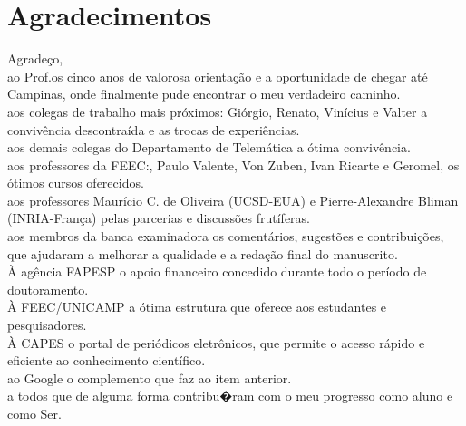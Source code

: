 
\chapter*{Agradecimentos}

\noindent Agradeço,\\[2mm]
ao Prof.\@Pedro os cinco anos de valorosa orientação e a oportunidade de chegar
até Campinas, onde finalmente pude encontrar o meu verdadeiro caminho.\\[2mm]
aos colegas de trabalho mais próximos: Giórgio, Renato, Vinícius e Valter a
convivência descontraída e as trocas de experiências.\\[2mm]
aos demais colegas do Departamento de Telemática a ótima convivência.\\[2mm]
aos professores da FEEC:\@Ivanil, Paulo Valente, Von Zuben, Ivan Ricarte e
Geromel, os ótimos cursos oferecidos.\\[2mm]
aos professores Maurício C. de Oliveira (UCSD-EUA) e Pierre-Alexandre Bliman
(INRIA-França) pelas parcerias e discussões frutíferas.\\[2mm]
aos membros da banca examinadora os comentários, sugestões e contribuições, que
ajudaram a melhorar a qualidade e a redação final do manuscrito.\\[2mm]
À agência FAPESP o apoio financeiro concedido durante todo o período de
doutoramento.\\[2mm]
À FEEC/UNICAMP a ótima estrutura que oferece aos estudantes e
pesquisadores.\\[2mm]
À CAPES o portal de periódicos eletrônicos, que permite o acesso rápido e
eficiente ao conhecimento científico.\\[2mm]
ao Google o complemento que faz ao item anterior.\\[2mm]
a todos que de alguma forma contribu�ram com o meu progresso como aluno e como
Ser.

\thispagestyle{plain}
\cleardoublepage{}
